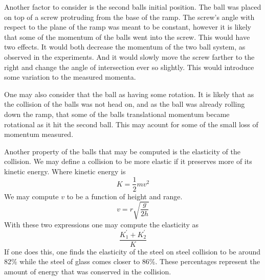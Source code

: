 \documentclass[11pt]{article}
\begin{document}
Another factor to consider is the second balls initial position. The ball was placed on top of a screw protruding from the base of the ramp. The screw's angle with respect to the plane of the ramp was meant to be constant, however it is likely that some of the momentum of the balls went into the screw. This would have two effects. It would both decrease the momentum of the two ball system, as observed in the experiments. And it would slowly move the screw farther to the right and change the angle of intersection ever so slightly. This would introduce some variation to the measured momenta.

One may also consider that the ball as having some rotation. It is likely that as the collision of the balls was not head on, and as the ball was already rolling down the ramp, that some of the balls translational momentum became rotational as it hit the second ball. This may acount for some of the small loss of momentum measured.

Another property of the balls that may be computed is the elasticity of the collision. We may define a collision to be more elastic if it preserves more of its kinetic energy. Where kinetic energy is 
\begin{equation}
	K = \frac{1}{2}m v^2 
\end{equation}
We may compute \(v\) to be a function of height and range.
\begin{equation}
v = r \sqrt{\frac{g}{2h}}
\end{equation}
With these two expressions one may compute the elasticity as
\begin{equation}
\frac{K^{\prime}_1+K^{\prime}_2}{K}
\end{equation}
If one does this, one finds the elasticity of the steel on steel collision to be around 82\% while the steel of glass comes closer to 86\%. These percentages represent the amount of energy that was conserved in the collision.
\end{document}
